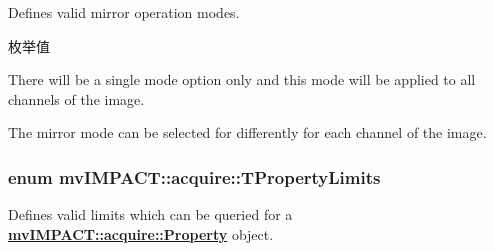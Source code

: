 Defines valid mirror operation modes. 

\begin{Desc}
\item[枚举值]\par
\begin{description}
\item[{\em 
\hypertarget{group___common_interface_gga5bb7986788cc889f815644ba1dab1c46ab729d48e62cba053a5f5d793d834ba36}{mom\+Global}\label{group___common_interface_gga5bb7986788cc889f815644ba1dab1c46ab729d48e62cba053a5f5d793d834ba36}
}]There will be a single mode option only and this mode will be applied to all channels of the image. \item[{\em 
\hypertarget{group___common_interface_gga5bb7986788cc889f815644ba1dab1c46ad5c344e6aa92fcf45f58924594c7bd34}{mom\+Channel\+Based}\label{group___common_interface_gga5bb7986788cc889f815644ba1dab1c46ad5c344e6aa92fcf45f58924594c7bd34}
}]The mirror mode can be selected for differently for each channel of the image. \end{description}
\end{Desc}
\hypertarget{group___common_interface_gab31a9721792e36b8c256a769961df4f9}{
\subsubsection[{T\+Property\+Limits}]{\setlength{\rightskip}{0pt plus 5cm}enum {\bf mv\+I\+M\+P\+A\+C\+T\+::acquire\+::\+T\+Property\+Limits}}}\label{group___common_interface_gab31a9721792e36b8c256a769961df4f9}


Defines valid limits which can be queried for a {\bfseries \hyperlink{classmv_i_m_p_a_c_t_1_1acquire_1_1_property}{mv\+I\+M\+P\+A\+C\+T\+::acquire\+::\+Property}} object. 

